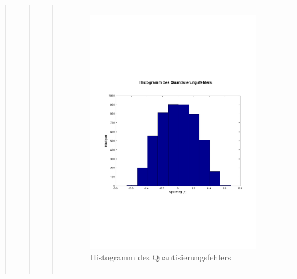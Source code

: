 \begin{quote}
\begin{quote}
\begin{quote}
\begin{center}
\begin{tabular}{ll}
                    \begin{minipage}{0.6\textwidth}
                        \begin{figure}[H]
                            \includegraphics[scale=0.4, trim = 0.8cm 7cm 0.8cm
                            8.5cm, clip]
                            {./Bilder/drei8_Histogramm}
                              \caption{Histogramm des Quantisierungsfehlers}
                        \end{figure}
                    \end{minipage}
                
                \end{tabular}
            \end{center}
            \vspace{1em}
            
            

\end{quote}
\end{quote}
\end{quote}
